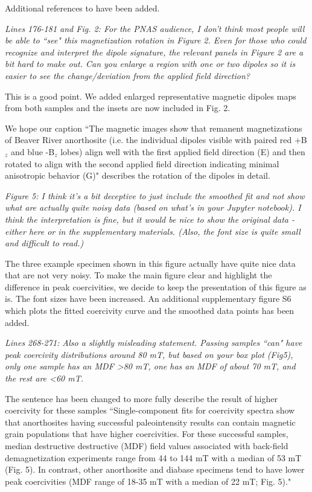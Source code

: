\documentclass[11pt, letterpaper]{article}
\begin{document}
\begin{flushleft}
Additional references to \cite{Wenk2011a, Ageeva2016a} have been added. 

\textit{Lines 176-181 and Fig. 2: For the PNAS audience, I don't think most people will be able to ``see" this magnetization rotation in Figure 2. Even for those who could recognize and interpret the dipole signature, the relevant panels in Figure 2 are a bit hard to make out. Can you enlarge a region with one or two dipoles so it is easier to see the change/deviation from the applied field direction?}

This is a good point. We added enlarged representative magnetic dipoles maps from both samples and the insets are now included in Fig. 2. 

We hope our caption  ``The magnetic images show that remanent magnetizations of Beaver River anorthosite (i.e. the individual dipoles visible with paired red +B$_z$ and blue -B$_z$ lobes) align well with the first applied field direction (E) and then rotated to align with the second applied field direction indicating minimal anisotropic behavior (G)" describes the rotation of the dipoles in detail.

\textit{Figure 5: I think it's a bit deceptive to just include the smoothed fit and not show what are actually quite noisy data (based on what's in your Jupyter notebook). I think the interpretation is fine, but it would be nice to show the original data - either here or in the supplementary materials. (Also, the font size is quite small and difficult to read.)}

The three example specimen shown in this figure actually have quite nice data that are not very noisy. To make the main figure clear and highlight the difference in peak coercivities, we decide to keep the presentation of this figure as is. The font sizes have been increased. 
An additional supplementary figure S6 which plots the fitted coercivity curve and the smoothed data points has been added. 

\textit{Lines 268-271: Also a slightly misleading statement. Passing samples ``can" have peak coercivity distributions around 80 mT, but based on your box plot (Fig5), only one sample has an MDF >80 mT, one has an MDF of about 70 mT, and the rest are <60 mT.}

The sentence has been changed to more fully describe the result of higher coercivity for these samples ``Single-component fits for coercivity spectra \citep{Maxbauer2016a} show that anorthosites having successful paleointensity results can contain magnetic grain populations that have higher coercivities. For these successful samples, median destructive destructive (MDF) field values associated with back-field demagnetization experiments range from 44 to 144 mT with a median of 53 mT (Fig. 5). In contrast, other anorthosite and diabase specimens tend to have lower peak coercivities (MDF range of 18-35 mT with a median of 22 mT; Fig. 5)."


\end{flushleft}
\end{document}
